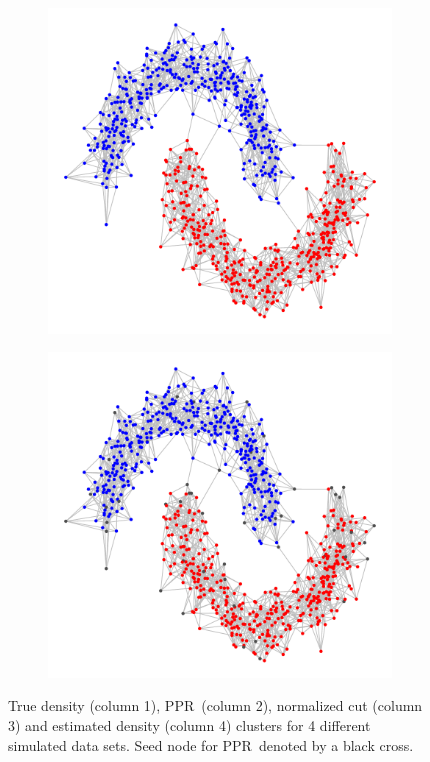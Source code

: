 \documentclass{article}
\newcommand{\1}{\mathbf{1}}
\newcommand{\pprspace}{{\sc PPR~}}
\theoremstyle{aldenthm}
\theoremstyle{aldenrmrk}
\begin{document}
\begin{figure}
\begin{adjustbox}{minipage=\linewidth,scale=0.8}
\begin{subfigure}{.24\linewidth}
		\caption{}
	\end{subfigure}
	\begin{subfigure}{.24\linewidth}
		\includegraphics[width=\linewidth]{example2plots/row4_conductance_cluster}
		\caption{}
	\end{subfigure}
	\begin{subfigure}{.24\linewidth}
		\includegraphics[width=\linewidth]{example2plots/row4_density_cluster}
		\caption{}
	\end{subfigure}
	\caption{True density (column 1), \pprspace (column 2), normalized cut (column 3) and estimated density (column 4) clusters for 4 different simulated data sets. Seed node for \pprspace denoted by a black cross.}
	\label{fig:fig2}
	\end{adjustbox}
\end{figure}
\end{document}
